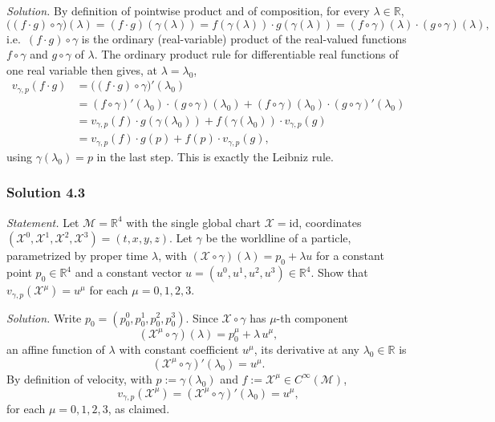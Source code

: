 \documentclass[11pt]{article}
\newcommand{\Cinf}{C^\infty(\mathcal M)}
\begin{document}
\medskip
\noindent\textit{Solution.} By definition of pointwise product and of
composition, for every $\lambda\in\mathbb R$,
\[
\big((f\cdot g)\circ\gamma\big)(\lambda) = (f\cdot g)(\gamma(\lambda)) =
f(\gamma(\lambda))\cdot g(\gamma(\lambda)) = (f\circ\gamma)(\lambda)\cdot
(g\circ\gamma)(\lambda),
\]
i.e.\ $(f\cdot g)\circ\gamma$ is the ordinary (real-variable) product of
the real-valued functions $f\circ\gamma$ and $g\circ\gamma$ of $\lambda$.
The ordinary product rule for differentiable real functions of one real
variable then gives, at $\lambda=\lambda_0$,
\begin{align*}
v_{\gamma,p}(f\cdot g)
&= \big((f\cdot g)\circ\gamma\big)'(\lambda_0) \\
&= (f\circ\gamma)'(\lambda_0)\cdot(g\circ\gamma)(\lambda_0) +
(f\circ\gamma)(\lambda_0)\cdot(g\circ\gamma)'(\lambda_0) \\
&= v_{\gamma,p}(f)\cdot g(\gamma(\lambda_0)) + f(\gamma(\lambda_0))\cdot
v_{\gamma,p}(g) \\
&= v_{\gamma,p}(f)\cdot g(p) + f(p)\cdot v_{\gamma,p}(g),
\end{align*}
using $\gamma(\lambda_0)=p$ in the last step. This is exactly the Leibniz
rule.

\subsubsection*{Solution 4.3}

\noindent\textit{Statement.} Let $\mathcal M=\mathbb R^4$ with the single
global chart $\mathcal X=\mathrm{id}$, coordinates $(\mathcal X^0,\mathcal
X^1,\mathcal X^2,\mathcal X^3)=(t,x,y,z)$. Let $\gamma$ be the worldline of
a particle, parametrized by proper time $\lambda$, with $(\mathcal
X\circ\gamma)(\lambda)=p_0+\lambda u$ for a constant point $p_0\in\mathbb
R^4$ and a constant vector $u=(u^0,u^1,u^2,u^3)\in\mathbb R^4$. Show that
$v_{\gamma,p}(\mathcal X^\mu)=u^\mu$ for each $\mu=0,1,2,3$.

\medskip
\noindent\textit{Solution.} Write $p_0=(p_0^0,p_0^1,p_0^2,p_0^3)$. Since
$\mathcal X\circ\gamma$ has $\mu$-th component
\[
(\mathcal X^\mu\circ\gamma)(\lambda) = p_0^\mu + \lambda\, u^\mu,
\]
an affine function of $\lambda$ with constant coefficient $u^\mu$, its
derivative at any $\lambda_0\in\mathbb R$ is
\[
(\mathcal X^\mu\circ\gamma)'(\lambda_0) = u^\mu.
\]
By definition of velocity, with $p:=\gamma(\lambda_0)$ and $f:=\mathcal
X^\mu\in\Cinf$,
\[
v_{\gamma,p}(\mathcal X^\mu) = (\mathcal X^\mu\circ\gamma)'(\lambda_0) =
u^\mu,
\]
for each $\mu=0,1,2,3$, as claimed.
\end{document}

